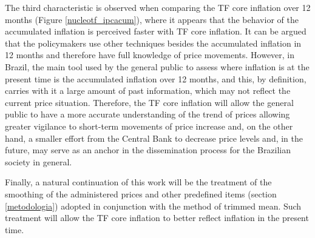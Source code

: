 \documentclass[10pt]{article}
\begin{document}
The third characteristic is observed when comparing the TF core inflation over 12 months (Figure \ref{nucleotf_ipcacum}), where it appears that the behavior of the accumulated inflation is perceived faster with TF core inflation. It can be argued that the policymakers use other techniques besides the accumulated inflation in 12 months and therefore have full knowledge of price movements. However, in Brazil, the main  tool used by the general public to assess where inflation is at the present time is the accumulated inflation over 12 months, and this, by definition, carries with it a large amount of past information, which may not reflect the current price situation. Therefore, the TF core inflation will allow the general public to have a more accurate understanding of the trend of prices allowing greater vigilance to short-term movements of price increase and, on the other hand, a smaller effort from the Central Bank to decrease price levels and, in the future, may serve as an anchor in the dissemination process for the Brazilian society in general.


Finally, a natural continuation of this work will be the treatment of the smoothing of the administered prices and other predefined items (section \ref{metodologia}) adopted in conjunction with the method of trimmed mean. Such treatment will allow the TF core inflation to better reflect inflation in the present time.





\end{document}
